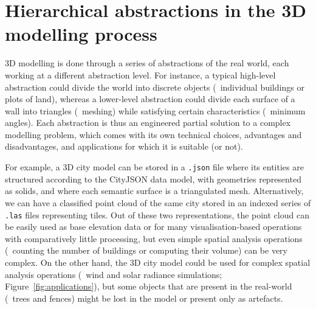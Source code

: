 \section{Hierarchical abstractions in the 3D modelling process}

3D modelling is done through a series of abstractions of the real world, each working at a different abstraction level.
For instance, a typical high-level abstraction could divide the world into discrete objects (\eg\ individual buildings or plots of land), whereas a lower-level abstraction could divide each surface of a wall into triangles (\ie\ meshing) while satisfying certain characteristics (\eg\ minimum angles).
Each abstraction is thus an engineered partial solution to a complex modelling problem, which comes with its own technical choices, advantages and disadvantages, and applications for which it is suitable (or not).

For example, a 3D city model can be stored in a \texttt{.json} file where its entities are structured according to the CityJSON data model, with geometries represented as solids, and where each semantic surface is a triangulated mesh.
Alternatively, we can have a classified point cloud of the same city stored in an indexed series of \texttt{.las} files representing tiles.
Out of these two representations, the point cloud can be easily used as base elevation data or for many visualisation-based operations with comparatively little processing, but even simple spatial analysis operations (\eg\ counting the number of buildings or computing their volume) can be very complex.
On the other hand, the 3D city model could be used for complex spatial analysis operations (\eg\ wind and solar radiance simulations; Figure~\ref{fig:applications}), but some objects that are present in the real-world (\eg\ trees and fences) might be lost in the model or present only as artefacts.


